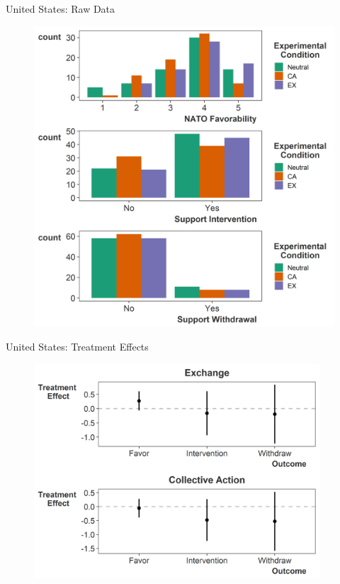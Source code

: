 \documentclass[12pt]{beamer}
\begin{document}
\begin{frame}{United States: Raw Data}

\begin{figure}[htbp]
	\centering
		\includegraphics[height=.95\textheight]{raw-us-pres.png}
\end{figure}


\end{frame}


\begin{frame}{United States: Treatment Effects}

\pause 

\begin{figure}[htbp]
	\centering
		\includegraphics[width=0.95\textwidth]{us-te-pres.png}
\end{figure}


\end{frame}
\end{document}
